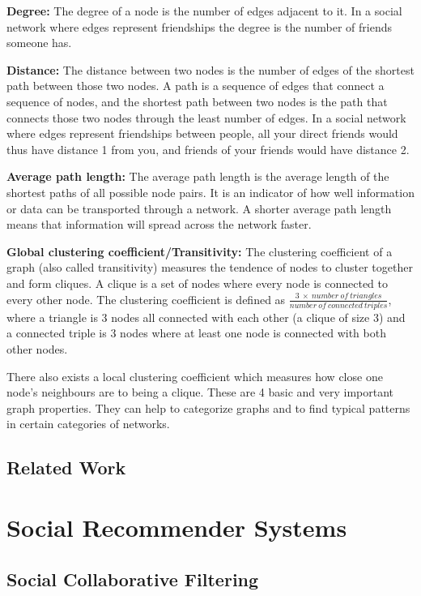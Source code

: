 \textbf{Degree:} The degree of a node is the number of edges adjacent to it. In a social network where edges represent friendships the degree is the number of friends someone has.

\textbf{Distance:} The distance between two nodes is the number of edges of the shortest path between those two nodes. A path is a sequence of edges that connect a sequence of nodes, and the shortest path between two nodes is the path that connects those two nodes through the least number of edges. In a social network where edges represent friendships between people, all your direct friends would thus have distance 1 from you, and friends of your friends would have distance 2.

\textbf{Average path length:} The average path length is the average length of the shortest paths of all possible node pairs. It is an indicator of how well information or data can be transported through a network. A shorter average path length means that information will spread across the network faster.

\textbf{Global clustering coefficient/Transitivity:} The clustering coefficient of a graph (also called transitivity) measures the tendence of nodes to cluster together and form cliques. A clique is a set of nodes where every node is connected to every other node. The clustering coefficient is defined as $\frac{3\:\times\:number\:of\:triangles}{number\:of\:connected\:triples}$, where a triangle is 3 nodes all connected with each other (a clique of size 3) and a connected triple is 3 nodes where at least one node is connected with both other nodes.

There also exists a local clustering coefficient which measures how close one node's neighbours are to being a clique.
\newline\newline
These are 4 basic and very important graph properties. They can help to categorize graphs and to find typical patterns in certain categories of networks. 

\subsection{Related Work}
\label{sst:snrelatedwork}

\section{Social Recommender Systems}
\label{st:socialrecommendersystems}

\subsection{Social Collaborative Filtering}
\label{sst:socialcf}